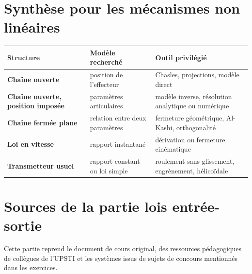 \section{Synthèse pour les mécanismes non linéaires}
\label{sec:les-synthese}

\begin{center}
\small
\begin{tabularx}{\linewidth}{>{\bfseries}p{3.2cm}X X}
\toprule
Structure & Modèle recherché & Outil privilégié \\
\midrule
Chaîne ouverte & position de l'effecteur & Chasles, projections, modèle direct \\
Chaîne ouverte, position imposée & paramètres articulaires & modèle inverse, résolution analytique ou numérique \\
Chaîne fermée plane & relation entre deux paramètres & fermeture géométrique, Al-Kashi, orthogonalité \\
Loi en vitesse & rapport instantané & dérivation ou fermeture cinématique \\
Transmetteur usuel & rapport constant ou loi simple & roulement sans glissement, engrènement, hélicoïdale \\
\bottomrule
\end{tabularx}
\end{center}

\section{Sources de la partie lois entrée-sortie}
\label{sec:les-sources}

Cette partie reprend le document de cours original, des ressources
pédagogiques de collègues de l'UPSTI et les systèmes issus de sujets de
concours mentionnés dans les exercices.
